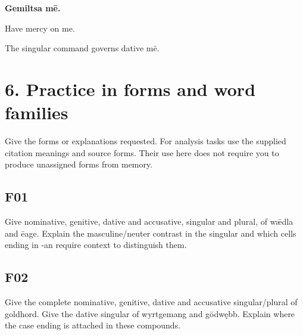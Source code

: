 \textbf{Gemiltsa mē.}

Have mercy on me.

The singular command governs dative mē.

\section*{6. Practice in forms and word families}

Give the forms or explanations requested. For analysis tasks use the supplied citation meanings and source forms. Their use here does not require you to produce unassigned forms from memory.

\par\begin{minipage}{\linewidth}\raggedright
\subsection*{F01}

Give nominative, genitive, dative and accusative, singular and plural, of wǣdla and ēage. Explain the masculine/\allowbreak{}neuter contrast in the singular and which cells ending in -an require context to distinguish them.

\end{minipage}\par\addvspace{4pt}

\par\begin{minipage}{\linewidth}\raggedright
\subsection*{F02}

Give the complete nominative, genitive, dative and accusative singular/\allowbreak{}plural of goldhord. Give the dative singular of wyrtgemang and gōdwębb. Explain where the case ending is attached in these compounds.

\end{minipage}\par\addvspace{4pt}

